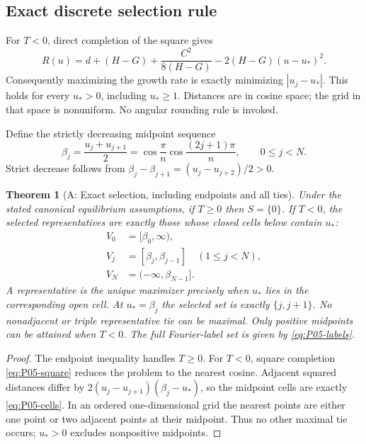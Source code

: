 \documentclass[11pt]{article}
\newtheorem{theorem}{Theorem}[section]
\theoremstyle{definition}
\theoremstyle{remark}
\begin{document}
\subsection{Exact discrete selection rule}
\label{slot:P05-2}
For $T<0$, direct completion of the square gives
\begin{equation}
 R(u)=d+(H-G)+\frac{C^2}{8(H-G)}
           -2(H-G)(u-u_*)^2.
 \label{eq:P05-square}
\end{equation}
Consequently maximizing the growth rate is exactly minimizing
$|u_j-u_*|$. This holds for every $u_*>0$, including $u_*\ge1$.
Distances are in cosine space; the grid in that space is nonuniform.
No angular rounding rule is invoked.

Define the strictly decreasing midpoint sequence
\begin{equation}
 \beta_j=\frac{u_j+u_{j+1}}2
 =\cos\frac\pi n\cos\frac{(2j+1)\pi}{n},\qquad 0\le j<N.
 \label{eq:P05-midpoints}
\end{equation}
Strict decrease follows from
$\beta_j-\beta_{j+1}=(u_j-u_{j+2})/2>0$.

\begin{theorem}[A: Exact selection, including endpoints and all ties]
\label{thm:P05-selection}
Under the stated canonical equilibrium assumptions, if $T\ge0$ then
$S=\{0\}$. If $T<0$, the selected representatives are exactly those
whose closed cells below contain $u_*$:
\begin{align}
 V_0&=[\beta_0,\infty),\label{eq:P05-cells}\\
 V_j&=[\beta_j,\beta_{j-1}]\quad(1\le j<N),\nonumber\\
 V_N&=(-\infty,\beta_{N-1}].\nonumber
\end{align}
A representative is the unique maximizer precisely when $u_*$ lies in
the corresponding open cell. At $u_*=\beta_j$ the selected set is
exactly $\{j,j+1\}$. No nonadjacent or triple representative tie can
be maximal. Only positive midpoints can be attained when $T<0$.
The full Fourier-label set is given by \eqref{eq:P05-labels}.
\end{theorem}
\begin{proof}
The endpoint inequality handles $T\ge0$. For $T<0$, square completion
\eqref{eq:P05-square} reduces the problem to the nearest cosine.
Adjacent squared distances differ by
$2(u_j-u_{j+1})(\beta_j-u_*)$, so the midpoint cells are exactly
\eqref{eq:P05-cells}. In an ordered one-dimensional grid the nearest
points are either one point or two adjacent points at their midpoint.
Thus no other maximal tie occurs; $u_*>0$ excludes nonpositive midpoints.
\end{proof}
\end{document}

